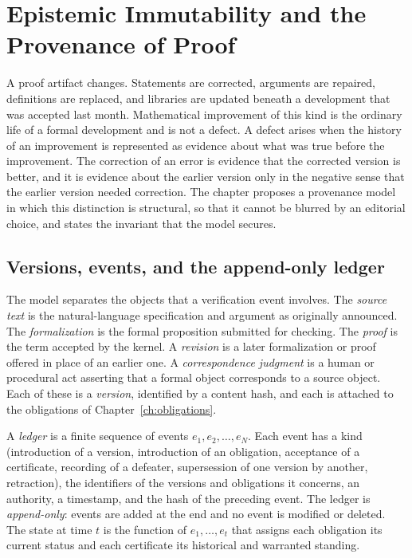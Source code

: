 \chapter[Epistemic Immutability]{Epistemic Immutability and the Provenance of Proof}
\label{ch:provenance}

A proof artifact changes. Statements are corrected, arguments are repaired, definitions are replaced, and libraries are updated beneath a development that was accepted last month. Mathematical improvement of this kind is the ordinary life of a formal development and is not a defect. A defect arises when the history of an improvement is represented as evidence about what was true before the improvement. The correction of an error is evidence that the corrected version is better, and it is evidence about the earlier version only in the negative sense that the earlier version needed correction. The chapter proposes a provenance model in which this distinction is structural, so that it cannot be blurred by an editorial choice, and states the invariant that the model secures.

\section{Versions, events, and the append-only ledger}
\label{sec:ledger18}

The model separates the objects that a verification event involves. The \emph{source text} is the natural-language specification and argument as originally announced. The \emph{formalization} is the formal proposition submitted for checking. The \emph{proof} is the term accepted by the kernel. A \emph{revision} is a later formalization or proof offered in place of an earlier one. A \emph{correspondence judgment} is a human or procedural act asserting that a formal object corresponds to a source object. Each of these is a \emph{version}, identified by a content hash, and each is attached to the obligations of Chapter~\ref{ch:obligations}.

\begin{definition}[Ledger]
A \emph{ledger} is a finite sequence of events $e_1, e_2, \dots, e_N$. Each event has a kind (introduction of a version, introduction of an obligation, acceptance of a certificate, recording of a defeater, supersession of one version by another, retraction), the identifiers of the versions and obligations it concerns, an authority, a timestamp, and the hash of the preceding event. The ledger is \emph{append-only}: events are added at the end and no event is modified or deleted. The state at time $t$ is the function of $e_1, \dots, e_t$ that assigns each obligation its current status and each certificate its historical and warranted standing.
\end{definition}

